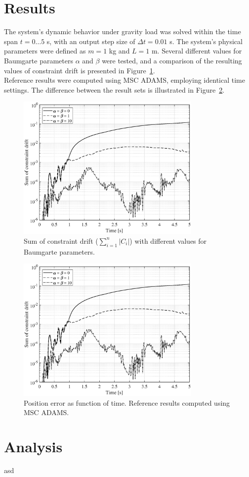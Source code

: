 \documentclass{article}
\begin{document}
\section*{Results}
The system's dynamic behavior under gravity load was solved within the time span $t = 0 \dots 5$ s, with an output step size of $\Delta t = 0.01$ s. The system's physical parameters were defined as $m = 1$ kg and $L = 1$ m. Several different values for Baumgarte parameters $\alpha$ and $\beta$ were tested, and a comparison of the resulting values of constraint drift is presented in Figure~\ref*{fig:constraintdrift}.\\

Reference results were computed using MSC ADAMS, employing identical time settings. The difference between the result sets is illustrated in Figure~\ref*{fig:comparison}.

\begin{figure}[h!]
	\centering
	\includegraphics[width=0.8\textwidth]{constraintdrift.eps}
	\caption{Sum of constraint drift ($\sum_{i=1}^{n} |C_i| $) with different values for Baumgarte parameters.\label{fig:constraintdrift}}
\end{figure}

\begin{figure}[h!]
	\centering
	\includegraphics[width=0.8\textwidth]{constraintdrift.eps}
	\caption{Position error as function of time. Reference results computed using MSC ADAMS.\label{fig:comparison}}
\end{figure}


\section*{Analysis}
asd
\end{document}
